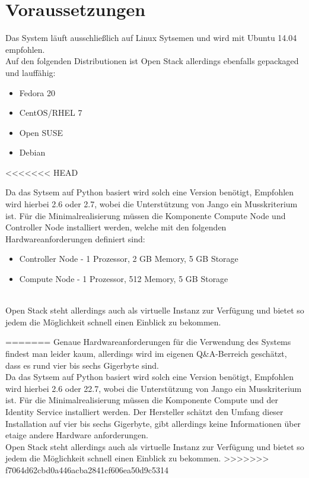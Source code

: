 \documentclass[a4paper,nochapterprefix,english,12pt]{scrreprt}
\begin{document}
\section{Voraussetzungen}
Das System läuft ausschließlich auf Linux Sytsemen und wird mit Ubuntu 14.04 empfohlen.\\
Auf den folgenden Distributionen ist Open Stack allerdings ebenfalls gepackaged und lauffähig:
\begin{itemize}
	\item Fedora 20
	\item CentOS/RHEL 7
	\item Open SUSE
	\item Debian
\end{itemize}
<<<<<<< HEAD

Da das Sytsem auf Python basiert wird solch eine Version benötigt, Empfohlen wird hierbei 2.6 oder 2.7, wobei die Unterstützung von Jango ein Musskriterium ist.
Für die Minimalrealisierung müssen die Komponente Compute Node und Controller Node installiert werden, welche mit den folgenden Hardwareanforderungen definiert sind:\\
\begin{itemize}
	\item Controller Node - 1 Prozessor, 2 GB Memory, 5 GB Storage
	\item Compute Node - 1 Prozessor, 512 Memory, 5 GB Storage\\\\
\end{itemize}
Open Stack steht allerdings auch als virtuelle Instanz zur Verfügung und bietet so jedem die Möglichkeit schnell einen Einblick zu bekommen. \cite{OS-BasicEnvironment} 

=======
Genaue Hardwareanforderungen für die Verwendung des Systems findest man leider kaum, allerdings wird im eigenen Q\&A-Berreich geschätzt, dass es rund vier bis sechs Gigerbyte sind.\\
Da das Sytsem auf Python basiert wird solch eine Version benötigt, Empfohlen wird hierbei 2.6 oder 22.7, wobei die Unterstützung von Jango ein Musskriterium ist.
Für die Minimalrealisierung müssen die Komponente Compute und der Identity Service installiert werden. Der Hersteller schätzt den Umfang dieser Installation auf vier bis sechs Gigerbyte, gibt allerdings keine Informationen über etaige andere Hardware anforderungen.\\
Open Stack steht allerdings auch als virtuelle Instanz zur Verfügung und bietet so jedem die Möglichkeit schnell einen Einblick zu bekommen.
>>>>>>> f7064d62cbd0a446acba2841cf606ea50d9c5314
\end{document}
